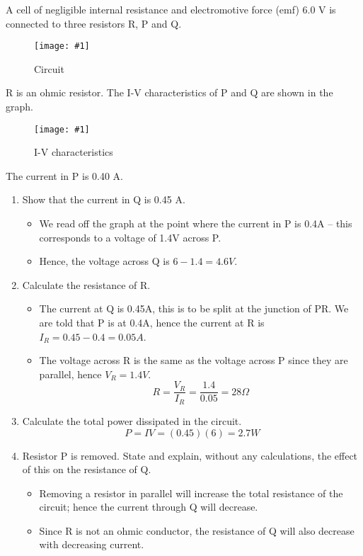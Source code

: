 \documentclass[a4paper,12pt]{article}
\newcommand{\img}[4]{\begin{center}
  \begin{figure}[H]
    \centering
    \texttt{[image: \#1]}
    \caption{#3}
    \label{fig:#4}
  \end{figure}
\end{center}}
\begin{document}
A cell of negligible internal resistance and electromotive force (emf) 6.0 V is connected to three resistors R, P and Q.

\img{ex/14.png}{0.5}{Circuit}{ex14}

R is an ohmic resistor. The I-V characteristics of P and Q are shown in the graph.

\img{ex/15.png}{0.5}{I-V characteristics}{ex15}

The current in P is 0.40 A.

\begin{enumerate}[label=(\alph*)]
  \item Show that the current in Q is 0.45 A.
        \begin{itemize}
          \item We read off the graph at the point where the current in P is 0.4A -- this corresponds to a voltage of 1.4V across P.
          \item Hence, the voltage across Q is $6 - 1.4 = 4.6V$.
        \end{itemize}
  \item Calculate the resistance of R.
        \begin{itemize}
          \item The current at Q is 0.45A, this is to be split at the junction of PR. We are told that P is at 0.4A, hence the current at R is $I_R = 0.45 - 0.4 = 0.05A$.
          \item The voltage across R is the same as the voltage across P since they are parallel, hence $V_R = 1.4V$.
                $$R = \frac{V_R}{I_R} = \frac{1.4}{0.05} = 28\Omega$$
        \end{itemize}
  \item Calculate the total power dissipated in the circuit.
        $$ P = IV = (0.45)(6) = 2.7W$$
  \item Resistor P is removed. State and explain, without any calculations, the effect of this on the resistance of Q.

        \begin{itemize}
          \item Removing a resistor in parallel will increase the total resistance of the circuit; hence the current through Q will decrease.
          \item Since R is not an ohmic conductor, the resistance of Q will also decrease with decreasing current.
        \end{itemize}
\end{enumerate}
\end{document}
